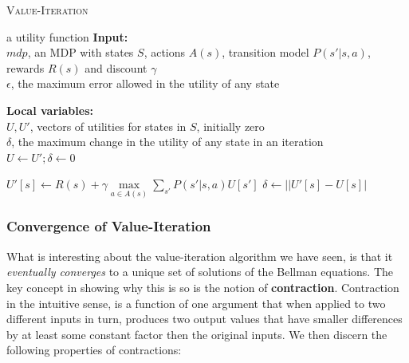 \documentclass[11pt]{article}
\begin{document}
\begin{algorithm}[!htb]
\caption{\textsc{Value-Iteration}}
\begin{algorithmic}[1]
 \Return a utility function
\State \textbf{Input:} \\
\hspace*{\algorithmicindent} \hspace*{\algorithmicindent} $mdp$, an MDP with states $S$, actions $A(s)$, transition model $P(s' | s, a)$,\\ 
\hspace*{\algorithmicindent} \hspace*{\algorithmicindent} rewards $R(s)$ and discount $\gamma$\\ 
\hspace*{\algorithmicindent} \hspace*{\algorithmicindent} $\epsilon$, the maximum error allowed in the utility of any state

\State \textbf{Local variables:} \\
\hspace*{\algorithmicindent} \hspace*{\algorithmicindent} $U, U'$, vectors of utilities for states in $S$, initially zero\\
\hspace*{\algorithmicindent} \hspace*{\algorithmicindent} $\delta$, the maximum change in the utility of any state in an iteration\\

\Repeat
\State $U \leftarrow U'; \delta \leftarrow 0$

\State $U'[s] \leftarrow R(s) +  \gamma \underset{a \in A(s)}{\max} \sum_{s'} P(s' | s, a) U[s']$
\State $\delta \leftarrow ||U'[s] - U[s]|$
\EndIf
\EndFor


\EndProcedure
\end{algorithmic}
\end{algorithm}

\subsubsection{Convergence of Value-Iteration}

What is interesting about the value-iteration algorithm we have seen, is that it \textit{eventually converges} to a unique set of solutions of the Bellman equations. The key concept in showing why this is so is the notion of \textbf{contraction}. Contraction in the intuitive sense, is a function of one argument that when applied to two different inputs in turn, produces two output values that have smaller differences by at least some constant factor then the original inputs. We then discern the following properties of contractions:
\end{document}
